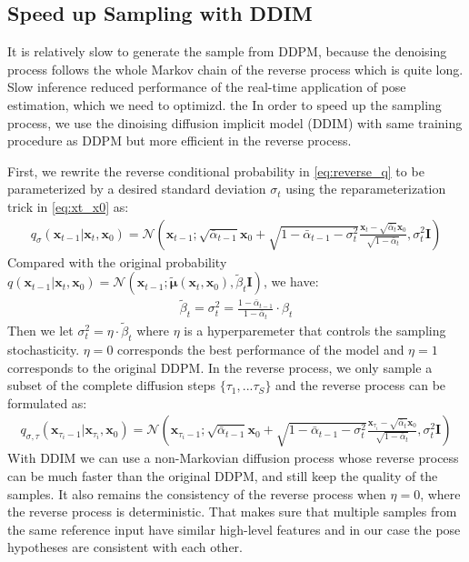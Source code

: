\documentclass[12pt,DIV14,BCOR12mm,a4paper,footinclude=false,headinclude,parskip=half-,twoside,openright,cleardoublepage=empty,toc=index,bibliography=totoc,listof=totoc]{scrreprt}
\numberwithin{equation}{chapter}
\begin{document}
\subsection{Speed up Sampling with DDIM}
It is relatively slow to generate the sample from DDPM, because the denoising process follows the whole Markov chain of the reverse process which is quite long. Slow inference reduced performance of the real-time application of pose estimation, which we need to optimizd. the In order to speed up the sampling process, we use the dinoising diffusion implicit model (DDIM)\cite{song2022denoising} with same training procedure as DDPM but more efficient in the reverse process.

First, we rewrite the reverse conditional probability in \ref{eq:reverse_q} to be parameterized by a desired standard deviation $\sigma_{t}$ using the reparameterization trick in \ref{eq:xt_x0} as:
\begin{align}
  q_{\sigma}(\mathbf{x}_{t-1}|\mathbf{x}_{t},\mathbf{x}_{0}) = \mathcal{N} (\mathbf{x}_{t-1}; \sqrt{\bar{\alpha}_{t-1}}\mathbf{x}_{0}+\sqrt{1-\bar{\alpha}_{t-1} - \sigma_{t}^{2}}\frac{\mathbf{x}_{t}-\sqrt{\bar{\alpha}_{t}}\mathbf{x}_{0}}{\sqrt{1-\bar{\alpha}_{t}}}, \sigma_{t}^{2}\mathbf{I})
\end{align}
Compared with the original probability $q(\mathbf{x}_{t-1}|\mathbf{x}_{t},\mathbf{x}_{0}) = \mathcal{N} (\mathbf{x}_{t-1}; \boldsymbol{\tilde{\mu}}(\mathbf{x}_{t}, \mathbf{x}_{0}), \tilde{\beta}_{t}\mathbf{I})$, we have:
\begin{align}
  \tilde{\beta}_{t}=\sigma_{t}^{2}=\frac{1-\bar{\alpha}_{t-1}}{1-\bar{\alpha}_{t}}\cdot\beta_{t}
\end{align}
Then we let $\sigma_{t}^{2}=\eta\cdot\tilde{\beta}_{t}$ where $\eta$ is a hyperparemeter that controls the sampling stochasticity. $\eta=0$ corresponds the best performance of the model and $\eta=1$ corresponds to the original DDPM. In the reverse process, we only sample a subset of the complete diffusion steps $\{\tau_{1},...\tau_{S}\}$ and the reverse process can be formulated as:
\begin{align}
  q_{\sigma,\tau}(\mathbf{x}_{\tau_{i}-1}|\mathbf{x}_{\tau_{i}},\mathbf{x}_{0}) = \mathcal{N} (\mathbf{x}_{\tau_{i}-1}; \sqrt{\bar{\alpha}_{t-1}}\mathbf{x}_{0}+\sqrt{1-\bar{\alpha}_{t-1} - \sigma_{t}^{2}}\frac{\mathbf{x}_{\tau_{i}}-\sqrt{\bar{\alpha}_{t}}\mathbf{x}_{0}}{\sqrt{1-\bar{\alpha}_{t}}}, \sigma_{t}^{2}\mathbf{I})
\end{align}
With DDIM we can use a non-Markovian diffusion process whose reverse process can be much faster than the original DDPM, and still keep the quality of the samples. It also remains the consistency of the reverse process when $\eta=0$, where the reverse process is deterministic. That makes sure that multiple samples from the same reference input have similar high-level features and in our case the pose hypotheses are consistent with each other.
\end{document}
